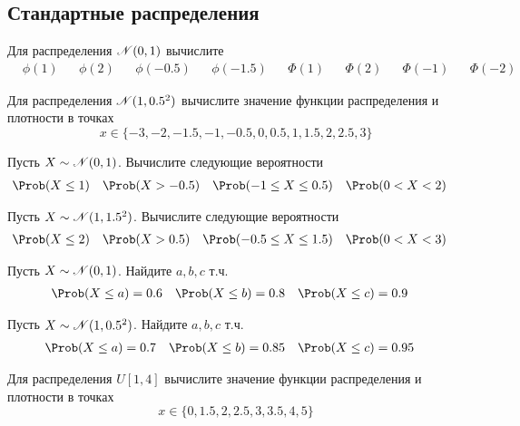 \subsection{Стандартные распределения}

\begin{exercise}
Для распределения \({\mathscr N}(0,1)\) вычислите
\begin{align*}
	&\phi(1) & &\phi(2) & &\phi(-0.5) & &\phi(-1.5) & &\Phi(1) & &\Phi(2) & &\Phi(-1) & &\Phi(-2)
\end{align*}
\end{exercise}

\begin{exercise}
Для распределения \({\mathscr N}(1,0.5^2)\) вычислите значение функции распределения и плотности в точках
\[
	x\in\{-3, -2, -1.5, -1, -0.5, 0, 0.5, 1, 1.5, 2, 2.5, 3\}
\]
\end{exercise}

\begin{exercise}
Пусть \(X\sim{\mathscr N}(0,1)\). Вычислите следующие вероятности
\begin{align*}
	&\Prob(X\leq1) & &\Prob(X>-0.5) & 
	&\Prob(-1\leq X\leq0.5) & &\Prob(0<X<2)
\end{align*}
\end{exercise}

\begin{exercise}
Пусть \(X\sim{\mathscr N}(1,1.5^2)\). Вычислите следующие вероятности
\begin{align*}
	&\Prob(X\leq2) & &\Prob(X>0.5) & 
	&\Prob(-0.5\leq X\leq1.5) & &\Prob(0<X<3)
\end{align*}
\end{exercise}

\begin{exercise}
Пусть \(X\sim{\mathscr N}(0,1)\). Найдите \(a,b,c\) т.ч.
\begin{align*}
	&\Prob(X\leq a)=0.6 & &\Prob(X\leq b)=0.8 & 
	&\Prob(X\leq c)=0.9
\end{align*}
\end{exercise}

\begin{exercise}
Пусть \(X\sim{\mathscr N}(1,0.5^2)\). Найдите \(a,b,c\) т.ч.
\begin{align*}
	&\Prob(X\leq a)=0.7 & &\Prob(X\leq b)=0.85 & 
	&\Prob(X\leq c)=0.95
\end{align*}
\end{exercise}

\begin{exercise}
Для распределения \(U[1, 4]\) 
вычислите значение функции распределения и плотности в точках
\[
	x\in\{0, 1.5, 2, 2.5, 3, 3.5, 4, 5\}
\]
\end{exercise}

